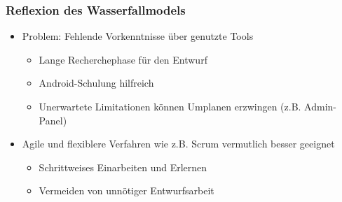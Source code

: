 \begin{frame}\frametitle{Reflexion des Wasserfallmodels}
    \begin{itemize}
        \item Problem: Fehlende Vorkenntnisse über genutzte Tools 
            \begin{itemize}
                \item Lange Recherchephase für den Entwurf
                \item Android-Schulung hilfreich
                \item Unerwartete Limitationen können Umplanen erzwingen (z.B. Admin-Panel)
            \end{itemize}
        \item Agile und flexiblere Verfahren wie z.B. Scrum vermutlich besser geeignet
            \begin{itemize}
                \item Schrittweises Einarbeiten und Erlernen
                \item Vermeiden von unnötiger Entwurfsarbeit
            \end{itemize}
    \end{itemize}
\end{frame}
